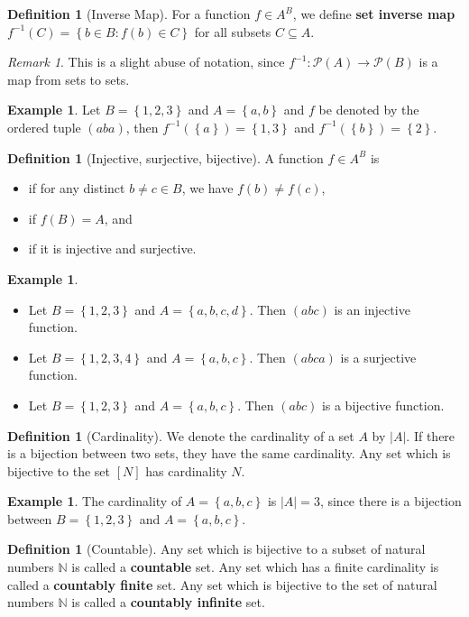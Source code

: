 \documentclass[letterpaper,10pt,english]{article}
\theoremstyle{plain}
\theoremstyle{definition}
\newtheorem{defn}[thm]{Definition}
\newtheorem{exmp}[thm]{Example}
\theoremstyle{remark}
\newtheorem{rem}{Remark}
\newcommand{\abs}[1]{\left\lvert#1\right\rvert}
\newcommand{\set}[1]{\left\{#1\right\}}
\newcommand{\N}{\mathbb{N}}
\newcommand{\cP}{\mathcal{P}}
\begin{document}
\begin{defn}[Inverse Map]
For a function $f \in A^B$, we define \textbf{set inverse map} $f^{-1}(C) = \set{b \in B: f(b) \in C}$ for all subsets $C \subseteq A$.  
\end{defn}
\begin{rem} 
This is a slight abuse of notation, since $f^{-1}: \cP(A) \to \cP(B)$ is a map from sets to sets. 
\end{rem}
\begin{shaded}
\begin{exmp}
Let $B = \set{1,2,3}$ and $A = \set{a,b}$ and $f$ be denoted by the ordered tuple $(aba)$, 
then $f^{-1}(\set{a}) = \set{1,3}$ and $f^{-1}(\set{b}) = \set{2}$.  
\end{exmp}
\end{shaded}
\begin{defn}[Injective, surjective, bijective]
A function $f \in A^B$ is 
\begin{itemize}
\item[\textbf{injective:}] if for any distinct $b \neq c \in B$, we have $f(b) \neq f(c)$,
\item[\textbf{surjective:}] if $f(B) = A$, and 
\item[\textbf{bijective:}] if it is injective and surjective.  
\end{itemize}
\end{defn}
\begin{shaded}
\begin{exmp}
\begin{itemize}
\item[\textbf{injective:}] Let $B = \set{1,2,3}$ and $A = \set{a,b,c,d}$.  
Then $(abc)$ is an injective function.   
\item[\textbf{surjective:}] Let $B = \set{1,2,3,4}$ and $A = \set{a,b,c}$.  
Then $(abca)$ is a surjective function.   
\item[\textbf{bijective:}] Let $B = \set{1,2,3}$ and $A = \set{a,b,c}$.  
Then $(abc)$ is a bijective function.    
\end{itemize}
\end{exmp}
\end{shaded}

\begin{defn}[Cardinality]
We denote the cardinality of a set $A$ by $\abs{A}$. 
If there is a bijection between two sets, they have the same cardinality.  
Any set which is bijective to the set $[N]$ has cardinality $N$.
\end{defn}
\begin{shaded}
\begin{exmp}
The cardinality of $A = \set{a,b,c}$ is $\abs{A} = 3$, since there is a bijection between $B = \set{1,2,3}$ and $A = \set{a,b,c}$.  
\end{exmp}
\end{shaded}
\begin{defn}[Countable]
Any set which is bijective to a subset of natural numbers $\N$ is called a \textbf{countable} set.  
Any set which has a finite cardinality is called a \textbf{countably finite} set. 
Any set which is bijective to the set of natural numbers $\N$ is called a \textbf{countably infinite} set. 
\end{defn}
\end{document}
